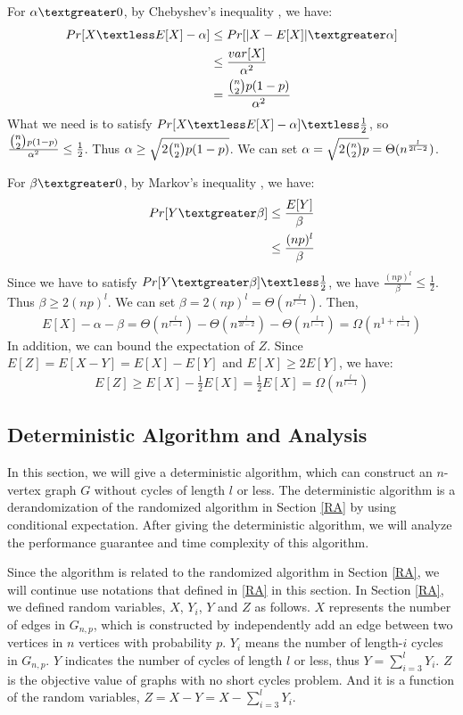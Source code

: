 For $\alpha \textgreater 0$, by 
Chebyshev's inequality
, we have:
\begin{align}
    \nonumber Pr[X\textless E[X]-\alpha]&\le Pr[|X-E[X]|\textgreater \alpha]\\ 
    \nonumber &\le \frac{var[X]}{\alpha^2}\\
    \nonumber &=\frac{\tbinom{n}{2}p(1-p)}{\alpha^2}
\end{align}
What we need is to satisfy $Pr[X\textless E[X]-\alpha] \textless \frac{1}{2}$, so $\frac{\tbinom{n}{2}p(1-p)}{\alpha^2}\le \frac{1}{2} $. Thus $\alpha \ge \sqrt{2\tbinom{n}{2}p(1-p)}$. We can set $\alpha = \sqrt{2\tbinom{n}{2}p}=\Theta(n^{\frac{l}{2l-2}})$.

For $\beta \textgreater 0$, by 
Markov's inequality
, we have: 
\begin{align}
    \nonumber Pr[Y \textgreater \beta] &\le \frac{E[Y]}{\beta}\\
    \nonumber & \le \frac{(np)^l}{\beta} 
\end{align}
Since we have to satisfy $Pr[Y \textgreater \beta]\textless \frac{1}{2}$, we have $\frac{(np)^l}{\beta} \le \frac{1}{2}$. Thus $\beta \ge 2(np)^l$. We can set $\beta = 2(np)^l = \Theta (n^{\frac{l}{l-1}})$.
Then,
\begin{align}
    \nonumber E[X]-\alpha-\beta = \Theta (n^\frac{l}{l-1}) - \Theta(n^{\frac{l}{2l-2}}) - \Theta (n^{\frac{l}{l-1}})=\Omega (n^{1+\frac{1}{l-1}})
\end{align}
In addition, we can bound the expectation of $Z$.
Since $E[Z]=E[X-Y]=E[X]-E[Y]$ and $E[X]\ge 2E[Y]$, we have:
\begin{align}
    \nonumber E[Z]\ge E[X]-\frac{1}{2}E[X]=\frac{1}{2}E[X]=\Omega (n^\frac{l}{l-1})
\end{align}
\subsection{Deterministic Algorithm and Analysis}
In this section, we will give a deterministic algorithm, which can construct an $n$-vertex graph $G$ without cycles of length $l$ or less.
The deterministic algorithm is a derandomization of the randomized algorithm in Section \ref{RA} by using conditional expectation.
After giving the deterministic algorithm, we will analyze
the performance guarantee and time complexity of this algorithm. 

Since the algorithm is related to the randomized algorithm in Section \ref{RA}, we will continue use notations that defined in \ref{RA} in this section.
In Section \ref{RA}, we defined random variables, $X$, $Y_i$, $Y$ and $Z$ as follows. 
$X$ represents the number of edges in $G_{n,p}$, which is constructed by independently add an edge between two vertices in $n$ vertices with probability $p$. 
$Y_i$ means the number of length-$i$ cycles in $G_{n,p}$. 
$Y$ indicates the number of cycles of length $l$ or less, thus $Y=\sum_{i=3}^{l}Y_i$.
$Z$ is the objective value of graphs with no short cycles problem. And it is a function of the random variables, $Z=X-Y=X-\sum_{i=3}^{l}Y_i$.
